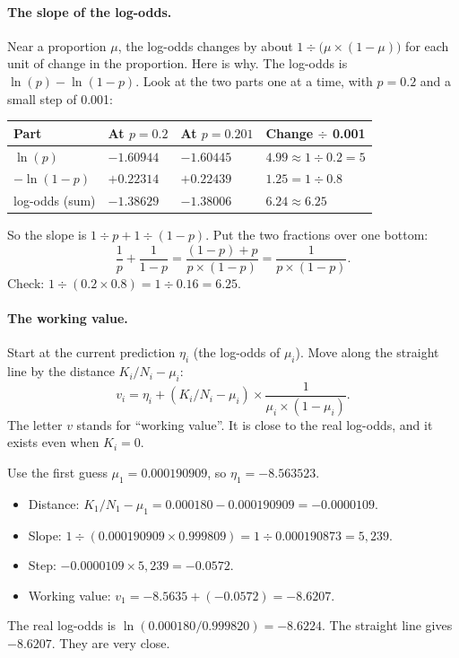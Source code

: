 \paragraph{The slope of the log-odds.} Near a proportion $\mu$, the
log-odds changes by about $1 \div \bigl(\mu \times (1-\mu)\bigr)$ for each
unit of change in the proportion. Here is why. The log-odds is
$\ln(p) - \ln(1-p)$. Look at the two parts one at a time, with $p = 0.2$
and a small step of 0.001:

\begin{center}
\small
\renewcommand{\arraystretch}{1.3}
\begin{tabular}{@{}l l l l@{}}
\toprule
Part & At $p = 0.2$ & At $p = 0.201$ & Change $\div$ 0.001\\
\midrule
$\ln(p)$ & $-1.60944$ & $-1.60445$ & $4.99 \approx 1 \div 0.2 = 5$\\
$-\ln(1-p)$ & $+0.22314$ & $+0.22439$ & $1.25 = 1 \div 0.8$\\
log-odds (sum) & $-1.38629$ & $-1.38006$ & $6.24 \approx 6.25$\\
\bottomrule
\end{tabular}
\end{center}

So the slope is $1 \div p + 1 \div (1-p)$. Put the two fractions over one
bottom:
\[
\frac{1}{p} + \frac{1}{1-p} = \frac{(1-p) + p}{p \times (1-p)}
 = \frac{1}{p \times (1-p)} .
\]
Check: $1 \div (0.2 \times 0.8) = 1 \div 0.16 = 6.25$.

\paragraph{The working value.} Start at the current prediction $\eta_i$
(the log-odds of $\mu_i$). Move along the straight line by the distance
$K_i/N_i - \mu_i$:
\[
v_i = \eta_i + (K_i/N_i - \mu_i) \times \frac{1}{\mu_i \times (1-\mu_i)} .
\]
The letter $v$ stands for ``working value''. It is close to the real
log-odds, and it exists even when $K_i = 0$.

\begin{worked}
Use the first guess $\mu_1 = 0.000190909$, so $\eta_1 = -8.563523$.
\begin{itemize}[leftmargin=1.2em]
\item Distance: $K_1/N_1 - \mu_1 = 0.000180 - 0.000190909 = -0.0000109$.
\item Slope: $1 \div (0.000190909 \times 0.999809) = 1 \div 0.000190873 =
  5{,}239$.
\item Step: $-0.0000109 \times 5{,}239 = -0.0572$.
\item Working value: $v_1 = -8.5635 + (-0.0572) = -8.6207$.
\end{itemize}
The real log-odds is $\ln(0.000180 / 0.999820) = -8.6224$. The straight line
gives $-8.6207$. They are very close.
\end{worked}

